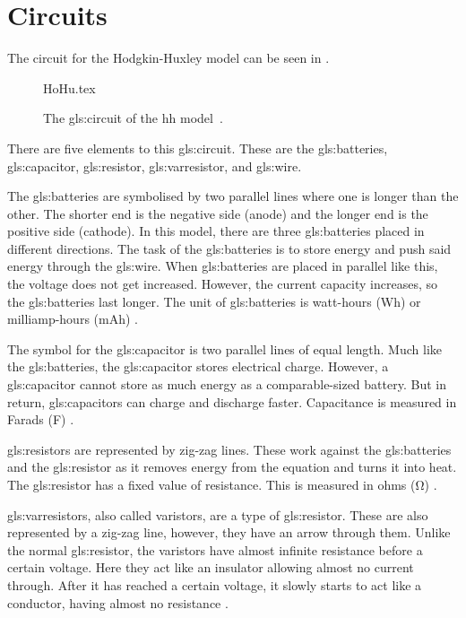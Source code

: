 \documentclass[class={myRUCProject}, crop=false]{standalone}
\begin{document}
 
 

\section{Circuits}
The circuit for the Hodgkin-Huxley model can be seen in . 

\begin{figure}[ht]
    \centering
    {HoHu.tex}
    \caption{The \gls{gls:circuit} of the \gls{hh} model~\cite{HodHux1952}.}\label{fig:HHcircuit}
\end{figure}
There are five elements to this \gls{gls:circuit}. These are the \gls{gls:batteries}, \gls{gls:capacitor}, \gls{gls:resistor}, \gls{gls:varresistor}, and \gls{gls:wire}. 

The \gls{gls:batteries} are symbolised by two parallel lines where one is longer than the other. The shorter end is the negative side (anode) and the longer end is the positive side (cathode). In this model, there are three \gls{gls:batteries} placed in different directions. The task of the \gls{gls:batteries} is to store energy and push said energy through the \gls{gls:wire}. When \gls{gls:batteries} are placed in parallel like this, the voltage does not get increased. However, the current capacity increases, so the \gls{gls:batteries} last longer. The unit of \gls{gls:batteries} is watt-hours (Wh) or milliamp-hours (mAh) \cite{}. 

The symbol for the \gls{gls:capacitor} is two parallel lines of equal length. Much like the \gls{gls:batteries}, the \gls{gls:capacitor} stores electrical charge. However, a \gls{gls:capacitor} cannot store as much energy as a comparable-sized battery. But in return, \gls{gls:capacitor}s can charge and discharge faster. Capacitance is measured in Farads (\unit{\farad}) \cite{}.

\gls{gls:resistor}s are represented by zig-zag lines. These work against the \gls{gls:batteries} and the \gls{gls:resistor} as it removes energy from the equation and turns it into heat. The \gls{gls:resistor} has a fixed value of resistance. This is measured in ohms (\unit{\ohm}) \cite{}.

\Glspl{gls:varresistor}, also called varistors, are a type of \gls{gls:resistor}. These are also represented by a zig-zag line, however, they have an arrow through them. Unlike the normal \gls{gls:resistor}, the varistors have almost infinite resistance before a certain voltage. Here they act like an insulator allowing almost no current through. After it has reached a certain voltage, it slowly starts to act like a conductor, having almost no resistance \cite{}. 
\end{document}
